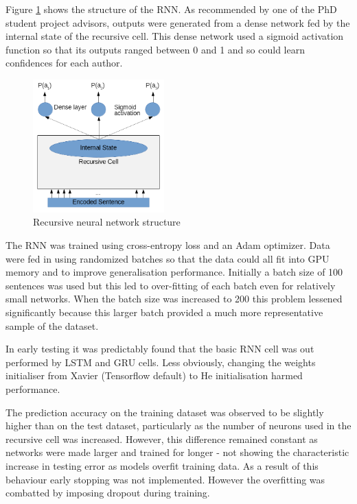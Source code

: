   Figure \ref{fig:rnn-structure} shows the structure of the RNN. As recommended
  by one of the PhD student project advisors, outputs were generated from a
  dense network fed by the internal state of the recursive cell. This dense
  network used a sigmoid activation function so that its outputs ranged between
  0 and 1 and so could learn confidences for each author. 
  
  \begin{figure}[ht]
    \includegraphics[width=0.45\textwidth]{Figures/rnn.png}
    \caption{Recursive neural network structure}
    \label{fig:rnn-structure}
  \end{figure}
  
    The RNN was trained using cross-entropy loss and an Adam optimizer. Data
    were fed in using randomized batches so that the data could all fit into GPU
    memory and to improve generalisation performance. Initially a batch size of
    100 sentences was used but this led to over-fitting of each batch even for
    relatively small networks. When the batch size was increased to 200 this
    problem lessened significantly because this larger batch provided a much
    more representative sample of the dataset. 
    
    In early testing it was predictably found that the basic RNN cell was out
    performed by LSTM and GRU cells. Less obviously, changing the weights
    initialiser from Xavier (Tensorflow default) to He initialisation harmed
    performance. 
    
    The prediction accuracy on the training dataset was observed to be slightly
    higher than on the test dataset, particularly as the number of neurons used
    in the recursive cell was increased. However, this difference remained
    constant as networks were made larger and trained for longer - not showing
    the characteristic increase in testing error as models overfit training
    data. As a result of this behaviour early stopping was not implemented.
    However the overfitting was combatted by imposing dropout during training.  
    
